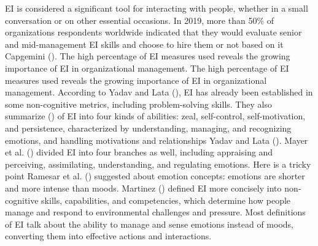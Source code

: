 \documentclass[
  man,
  longtable,
  nolmodern,
  notxfonts,
  notimes,
  colorlinks=true,linkcolor=blue,citecolor=blue,urlcolor=blue]{apa7}
\begin{document}
EI is considered a significant tool for interacting with people, whether
in a small conversation or on other essential occasions. In 2019, more
than 50\% of organizations respondents worldwide indicated that they
would evaluate senior and mid-management EI skills and choose to hire
them or not based on it Capgemini ().
The high percentage of EI measures used reveals the growing importance
of EI in organizational management. The high percentage of EI measures
used reveals the growing importance of EI in organizational management.
According to Yadav and Lata (), EI has
already been established in some non-cognitive metrics, including
problem-solving skills. They also summarize
()
of EI into four kinds of abilities: zeal, self-control, self-motivation,
and persistence, characterized by understanding, managing, and
recognizing emotions, and handling motivations and relationships Yadav
and Lata (). Mayer et al.
() divided EI into four branches as well,
including appraising and perceiving, assimilating, understanding, and
regulating emotions. Here is a tricky point Ramesar et al.
() suggested about emotion concepts:
emotions are shorter and more intense than moods. Martinez
() defined EI more concisely into
non‐cognitive skills, capabilities, and competencies, which determine
how people manage and respond to environmental challenges and pressure.
Most definitions of EI talk about the ability to manage and sense
emotions instead of moods, converting them into effective actions and
interactions.
\end{document}

